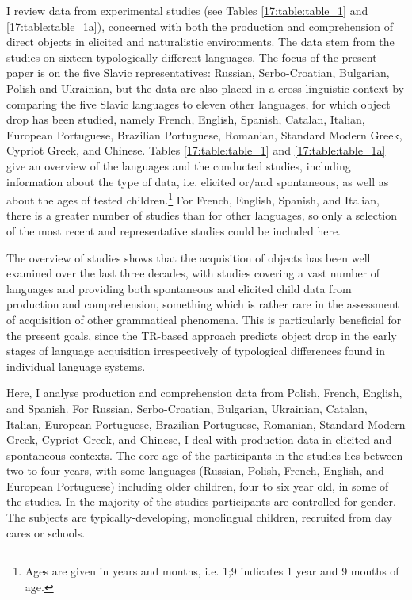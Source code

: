 \documentclass[output=paper,
modfonts,
newtxmath,
hidelinks,
]{langscibook}
\begin{document}
I review data from experimental studies (see Tables \ref{17:table:table_1} and \ref{17:table:table_1a}), concerned with both the production and comprehension of direct objects in elicited and naturalistic environments. The data stem from the studies on sixteen typologically different languages. The focus of the present paper is on the five Slavic representatives: Russian, Serbo-Croatian, Bulgarian, Polish and Ukrainian, but the data are also placed in a cross-linguistic context by comparing the five Slavic languages to eleven other languages, for which object drop has been studied, namely French, English, Spanish, Catalan, Italian, European Portuguese, Brazilian Portuguese, Romanian, Standard Modern Greek, Cypriot Greek, and Chinese. Tables \ref{17:table:table_1} and \ref{17:table:table_1a} give an overview of the languages and the conducted studies, including information about the type of data, i.e. elicited or/and spontaneous, as well as about the ages of tested children.\footnote{\label{17:fn3}Ages are given in years and months, i.e. 1;9 indicates 1 year and 9 months of age.} For French, English, Spanish, and Italian, there is a greater number of studies than for other languages, so only a selection of the most recent and representative studies could be included here.

The overview of studies shows that the acquisition of objects has been well examined over the last three decades, with studies covering a vast number of languages and providing both spontaneous and elicited child data from production and comprehension, something which is rather rare in the assessment of acquisition of other grammatical phenomena. This is particularly beneficial for the present goals, since the TR-based approach predicts object drop in the early stages of language acquisition irrespectively of typological differences found in individual language systems.\largerpage[-2]

Here, I analyse production and comprehension data from Polish, French, English, and Spanish. For Russian, Serbo-Croatian, Bulgarian, Ukrainian, Catalan, Italian, European Portuguese, Brazilian Portuguese, Romanian, Standard Modern Greek, Cypriot Greek, and Chinese, I deal with production data in elicited and spontaneous contexts. The core age of the participants in the studies lies between two to four years, with some languages (Russian, Polish, French, English, and European Portuguese) including older children, four to six year old, in some of the studies. In the majority of the studies participants are controlled for gender. The subjects are typically-developing, monolingual children, recruited from day cares or schools.
\end{document}
